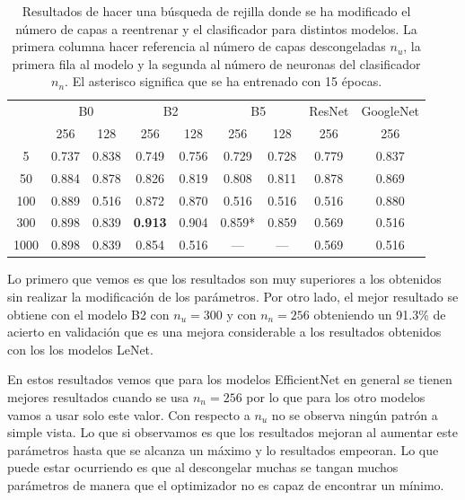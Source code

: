 \documentclass[a4paper,12pt,twoside,titlepage]{article}
\begin{document}
\begin{table}[h!]
  \centering
  \begin{tabular}{|c||cc|cc|cc|c|c|}
  \hline
  \multirow{2}{*}{} & \multicolumn{2}{c|}{B0}            & \multicolumn{2}{c|}{B2}            & \multicolumn{2}{c|}{B5}             & ResNet & GoogleNet \\ \cline{2-9} 
                    & \multicolumn{1}{c|}{256}   & 128   & \multicolumn{1}{c|}{256}   & 128   & \multicolumn{1}{c|}{256}    & 128   & 256    & 256       \\ \hline\hline
  5                 & \multicolumn{1}{c|}{0.737} & 0.838 & \multicolumn{1}{c|}{0.749} & 0.756 & \multicolumn{1}{c|}{0.729}  & 0.728 & 0.779  & 0.837     \\ \hline
  50                & \multicolumn{1}{c|}{0.884} & 0.878 & \multicolumn{1}{c|}{0.826} & 0.819 & \multicolumn{1}{c|}{0.808}  & 0.811 & 0.878  & 0.869     \\ \hline
  100               & \multicolumn{1}{c|}{0.889} & 0.516 & \multicolumn{1}{c|}{0.872} & 0.870 & \multicolumn{1}{c|}{0.516}  & 0.516 & 0.516  & 0.880     \\ \hline
  300               & \multicolumn{1}{c|}{0.898} & 0.839 & \multicolumn{1}{c|}{\textbf{0.913}} & 0.904 & \multicolumn{1}{c|}{0.859*} & 0.859 & 0.569  & 0.516     \\ \hline
  1000              & \multicolumn{1}{c|}{0.898} & 0.839 & \multicolumn{1}{c|}{0.854} & 0.516 & \multicolumn{1}{c|}{---}    & ---   & 0.569  & 0.516     \\ \hline
  \end{tabular}
  \caption{Resultados de hacer una búsqueda de rejilla donde se ha modificado el número de capas a reentrenar y el clasificador para distintos modelos. La primera columna hacer referencia al número de capas descongeladas $n_u$, la primera fila al modelo y la segunda al número de neuronas del clasificador $n_n$. El asterisco significa que se ha entrenado con 15 épocas.}
  \label{tab:res_ajuste_pre}
\end{table}

Lo primero que vemos es que los resultados son muy superiores a los obtenidos sin realizar la modificación de los parámetros. Por otro lado, el mejor resultado se obtiene con el modelo B2 con $n_u = 300$ y con $n_n = 256$ obteniendo un 91.3\% de acierto en validación que es una mejora considerable a los resultados obtenidos con los los modelos LeNet.

En estos resultados vemos que para los modelos EfficientNet en general se tienen mejores resultados cuando se usa $n_n = 256$ por lo que para los otro modelos vamos a usar solo este valor. Con respecto a $n_u$ no se observa ningún patrón a simple vista. Lo que si observamos es que los resultados mejoran al aumentar este parámetros hasta que se alcanza un máximo y lo resultados empeoran. Lo que puede estar ocurriendo es que al descongelar muchas se tangan muchos parámetros de manera que el optimizador no es capaz de encontrar un mínimo. 
\end{document}
